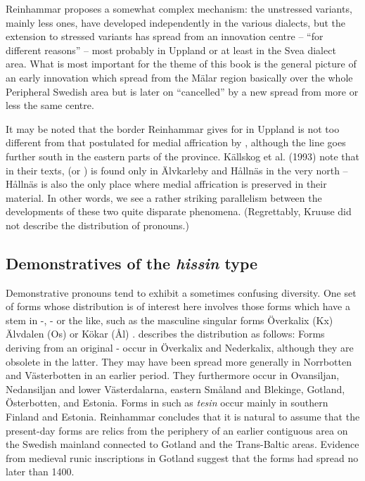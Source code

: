 Reinhammar proposes a somewhat complex mechanism: the unstressed variants, mainly less ones, have developed independently in the various dialects, but the extension to stressed variants has spread from an innovation centre – “for different reasons” –  most probably in Uppland or at least in the Svea dialect area. What is most important for the theme of this book is the general picture of an early innovation which spread from the Mälar region basically over the whole Peripheral Swedish area but is later on “cancelled” by a new spread from more or less the same centre. 




It may be noted that the border Reinhammar gives for  in Uppland is not too different from that postulated for medial affrication by \citet{Kruuse1908}, although the  line goes further south in the eastern parts of the province. Källskog et al. (1993) note that in their texts,  (or ) is found only in Älvkarleby and Hållnäs in the very north – Hållnäs is also the only place where medial affrication is preserved in their material. In other words, we see a rather striking parallelism between the developments of these two quite disparate phenomena. (Regrettably, Kruuse did not describe the distribution of pronouns.)



\subsection{Demonstratives of the \textit{hissin} type}

Demonstrative pronouns tend to exhibit a sometimes confusing diversity. One set of forms whose distribution is of interest here involves those forms which have a stem in -, - or the like, such as the masculine singular forms Överkalix (Kx) Älvdalen (Os) or Kökar (Ål) . \citet{Reinhammar1988} describes the distribution as follows: Forms deriving from an original - occur in Överkalix and Nederkalix, although they are obsolete in the latter. They may have been spread more  generally in Norrbotten and Västerbotten in an earlier period. They furthermore occur in Ovansiljan, Nedansiljan and lower Västerdalarna, eastern Småland and Blekinge, Gotland, Österbotten, and Estonia. Forms in  such as \textit{tesin} occur mainly in southern Finland and Estonia. Reinhammar concludes that it is natural to assume that the present-day forms are relics from the periphery of an earlier contiguous area on the Swedish mainland connected to Gotland and the Trans-Baltic areas. Evidence from medieval runic inscriptions in Gotland suggest that the forms had spread no later than 1400.

